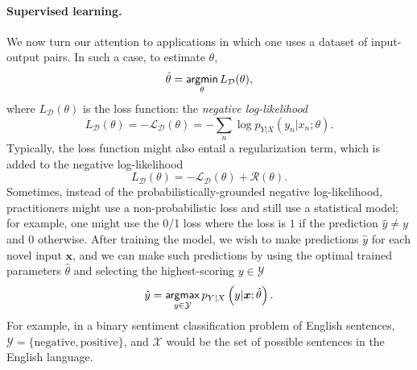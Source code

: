 \paragraph*{Supervised learning.} We now turn our attention to applications
in which one uses a dataset of input-output pairs. In such a case,
to estimate $\theta$,
%
\begin{equation}
    \hat{\theta} = \operatorname*{\mathsf{argmin}}_\theta L_\mathcal{D}(\theta),
\end{equation}
%
where $L_\mathcal{D}(\theta)$ is the loss function:
the \textit{negative log-likelihood}
%
\begin{equation}
    L_\mathcal{D}(\theta) = -\mathcal{L}_\mathcal{D}(\theta) =
    - \sum_n \log p_{Y|X}(y_n|x_n; \theta).
\end{equation}
%
Typically, the loss function might also entail a regularization term,
which is added to the negative log-likelihood
%
\begin{equation}
    L_\mathcal{D}(\theta) = -\mathcal{L}_\mathcal{D}(\theta) + \mathcal{R}(\theta).
\end{equation}
%
Sometimes, instead of the probabilistically-grounded negative
log-likelihood, practitioners might use a non-probabilistic loss and
still use a statistical model; for example, one might use the 0/1
loss where the loss is $1$ if the prediction $\hat{y}\neq y$ and $0$
otherwise.
After training the model, we
wish to make predictions $\hat{y}$ for each novel input $\bm{x}$, and we can
make such predictions by using the optimal trained parameters $\hat{\theta}$
and selecting the highest-scoring $y\in\mathcal{Y}$
%
\begin{equation}
    \hat{y}=\operatorname*{\mathsf{argmax}}_{y\in\mathcal{Y}}p_{Y|X}\left(y|\bm{x};\hat{\theta}\right).
\end{equation}
%
For example, in a binary sentiment classification problem of English
sentences, $\mathcal{Y}=\{\text{negative},\text{positive}\}$, and
$\mathcal{X}$ would be the set of possible sentences in the English
language.


